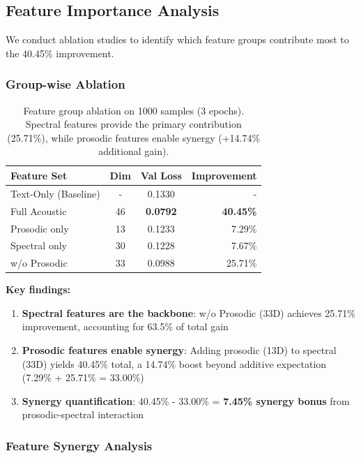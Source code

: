 
\subsection{Feature Importance Analysis}
\label{subsec:feature_importance}

We conduct ablation studies to identify which feature groups contribute most to the 40.45\% improvement.

\subsubsection{Group-wise Ablation}

\begin{table}[t]
\centering
\small
\begin{tabular}{lccr}
\toprule
\textbf{Feature Set} & \textbf{Dim} & \textbf{Val Loss} & \textbf{Improvement} \\
\midrule
Text-Only (Baseline) & - & 0.1330 & - \\
\midrule
Full Acoustic & 46 & \textbf{0.0792} & \textbf{40.45\%} \\
\midrule
Prosodic only & 13 & 0.1233 & 7.29\% \\
Spectral only & 30 & 0.1228 & 7.67\% \\
\midrule
w/o Prosodic & 33 & 0.0988 & 25.71\% \\
\bottomrule
\end{tabular}
\caption{Feature group ablation on 1000 samples (3 epochs). Spectral features provide the primary contribution (25.71\%), while prosodic features enable synergy (+14.74\% additional gain).}
\label{tab:ablation}
\end{table}

\textbf{Key findings:}
\begin{enumerate}
    \item \textbf{Spectral features are the backbone}: w/o Prosodic (33D) achieves 25.71\% improvement, accounting for 63.5\% of total gain
    \item \textbf{Prosodic features enable synergy}: Adding prosodic (13D) to spectral (33D) yields 40.45\% total, a 14.74\% boost beyond additive expectation (7.29\% + 25.71\% = 33.00\%)
    \item \textbf{Synergy quantification}: 40.45\% - 33.00\% = \textbf{7.45\% synergy bonus} from prosodic-spectral interaction
\end{enumerate}

\subsubsection{Feature Synergy Analysis}

